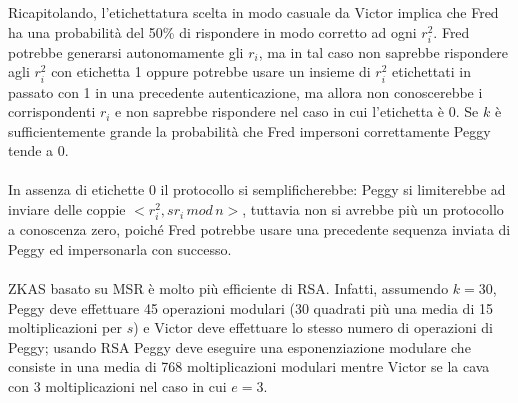 Ricapitolando, l'etichettatura scelta in modo casuale da Victor implica che Fred ha una probabilità del 50\% di rispondere in modo corretto ad ogni $r_{i}^2$. Fred potrebbe generarsi autonomamente gli $r_{i}$, ma in tal caso non saprebbe rispondere agli $r_{i}^2$ con etichetta 1 oppure potrebbe usare un insieme di $r_{i}^2$ etichettati in passato con 1 in una precedente autenticazione, ma allora non conoscerebbe i corrispondenti $r_{i}$ e non saprebbe rispondere nel caso in cui l'etichetta è 0. Se $k$ è sufficientemente grande la probabilità che Fred impersoni correttamente Peggy tende a 0. \\ \\
In assenza di etichette 0 il protocollo si semplificherebbe: Peggy si limiterebbe ad inviare delle coppie $<r_{i}^2, sr_{i} \, mod \, n>$, tuttavia non si avrebbe più un protocollo a conoscenza zero, poiché Fred potrebbe usare una precedente sequenza inviata di Peggy ed impersonarla con successo. \\ \\
ZKAS basato su MSR è molto più efficiente di RSA. Infatti, assumendo $k = 30$, Peggy deve effettuare 45 operazioni modulari (30 quadrati più una media di 15 moltiplicazioni per $s$) e Victor deve effettuare lo stesso numero di operazioni di Peggy; usando RSA Peggy deve eseguire una esponenziazione modulare che consiste in una media di 768 moltiplicazioni modulari mentre Victor se la cava con 3 moltiplicazioni nel caso in cui $e = 3$.
